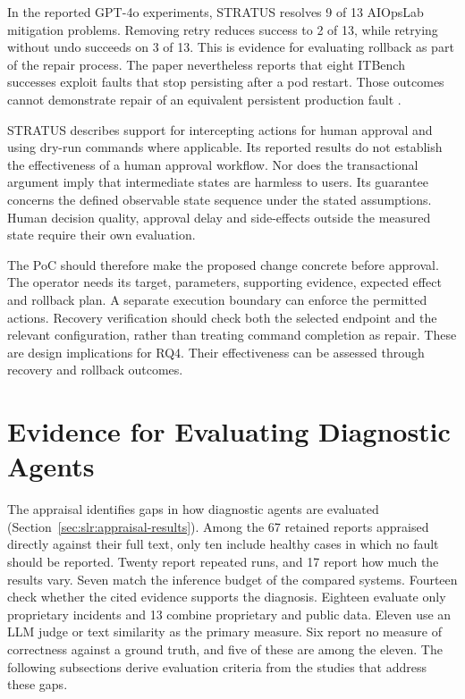 In the reported GPT-4o experiments, STRATUS resolves 9 of 13 AIOpsLab
mitigation problems. Removing retry reduces success to 2 of 13, while
retrying without undo succeeds on 3 of 13. This is evidence for evaluating
rollback as part of the repair process. The paper nevertheless reports
that eight ITBench successes exploit faults that stop persisting after a
pod restart. Those outcomes cannot demonstrate repair of an equivalent
persistent production fault
\parencite[Section~5, Tables~2--3]{chen2025stratus}.

STRATUS describes support for intercepting actions for human approval and
using dry-run commands where applicable. Its reported results do not
establish the effectiveness of a human approval workflow. Nor does the
transactional argument imply that intermediate states are harmless to
users. Its guarantee concerns the defined observable state sequence under
the stated assumptions. Human decision quality, approval delay and
side-effects outside the measured state require their own evaluation.

The PoC should therefore make the proposed change concrete before approval.
The operator needs its target, parameters, supporting evidence, expected
effect and rollback plan. A separate execution boundary can enforce the
permitted actions. Recovery verification should check both the selected
endpoint and the relevant configuration, rather than treating command
completion as repair. These are design implications for RQ4. Their
effectiveness can be assessed through recovery and rollback outcomes.


\section{Evidence for Evaluating Diagnostic Agents}
\label{sec:state-of-the-art:evaluation}

The appraisal identifies gaps in how diagnostic agents are evaluated
(Section~\ref{sec:slr:appraisal-results}). Among the 67 retained reports
appraised directly against their full text, only ten include healthy
cases in which no fault should be reported. Twenty report repeated runs,
and 17 report how much the results vary. Seven match the inference budget
of the compared systems. Fourteen check whether the cited evidence
supports the diagnosis. Eighteen evaluate only proprietary incidents and
13 combine proprietary and public data. Eleven use an LLM judge or text
similarity as the primary measure. Six report no measure of correctness
against a ground truth, and five of these are among the eleven. The
following subsections derive evaluation criteria from the studies that
address these gaps.

